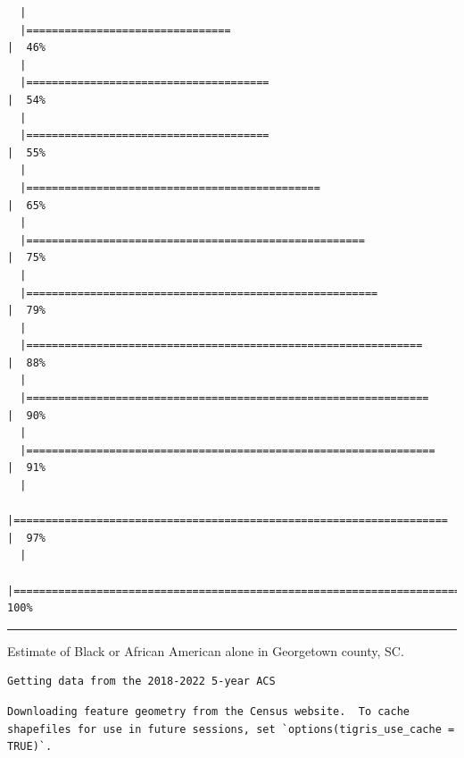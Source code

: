 \documentclass[
  letterpaper,
  DIV=11,
  numbers=noendperiod]{scrartcl}
\begin{document}
\begin{verbatim}
  |                                                                            
  |================================                                      |  46%
  |                                                                            
  |======================================                                |  54%
  |                                                                            
  |======================================                                |  55%
  |                                                                            
  |==============================================                        |  65%
  |                                                                            
  |=====================================================                 |  75%
  |                                                                            
  |=======================================================               |  79%
  |                                                                            
  |==============================================================        |  88%
  |                                                                            
  |===============================================================       |  90%
  |                                                                            
  |================================================================      |  91%
  |                                                                            
  |====================================================================  |  97%
  |                                                                            
  |======================================================================| 100%
\end{verbatim}

\begin{center}\rule{0.5\linewidth}{0.5pt}\end{center}

Estimate of Black or African American alone in Georgetown county, SC.

\begin{verbatim}
Getting data from the 2018-2022 5-year ACS
\end{verbatim}

\begin{verbatim}
Downloading feature geometry from the Census website.  To cache shapefiles for use in future sessions, set `options(tigris_use_cache = TRUE)`.
\end{verbatim}
\end{document}
